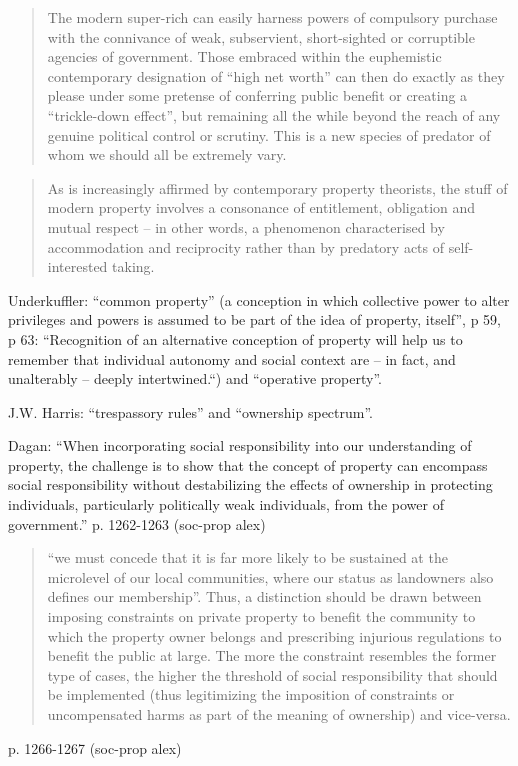 \begin{quote}
The modern super-rich can easily harness powers of compulsory purchase with the connivance of weak, subservient, short-sighted or corruptible agencies of government. Those embraced within the euphemistic contemporary designation of ``high net worth'' can then do exactly as they please under some pretense of conferring public benefit or creating a ``trickle-down effect'', but remaining all the while beyond the reach of any genuine political control or scrutiny. This is a new species of predator of whom we should all be extremely vary.
\end{quote}

\begin{quote}
As is increasingly affirmed by contemporary property theorists, the stuff of modern property involves a consonance of entitlement, obligation and mutual respect -- in other words, a phenomenon characterised by accommodation and reciprocity rather than by predatory acts of self-interested taking.
\end{quote}

Underkuffler: ``common property'' (a conception in which collective power to alter privileges and powers is assumed to be part of the idea of property, itself'', p 59, p 63:  ``Recognition of an alternative conception of property will help us to remember that individual autonomy and social context are -- in fact, and unalterably -- deeply intertwined.``)  and ``operative property''. 

J.W. Harris:  ``trespassory rules'' and ``ownership spectrum''.

Dagan: ``When incorporating social responsibility into our understanding
of property, the challenge is to show that the concept of property can
encompass social responsibility without destabilizing the effects
of ownership in protecting individuals, particularly politically
weak individuals, from the power of government.'' p. 1262-1263 (soc-prop alex)

\begin{quote}``we must concede that it is far more likely to be sustained at the microlevel of our local communities, where our status as landowners also defines our membership''. Thus, a distinction should be drawn between imposing constraints on private property to benefit the community to which the property owner belongs and prescribing injurious regulations to benefit the public at large. The more the constraint resembles the former type of cases, the higher the threshold of social responsibility that should be implemented (thus legitimizing the imposition of constraints  or uncompensated harms as part of the meaning of ownership) and vice-versa.
\end{quote}p. 1266-1267 (soc-prop alex)

